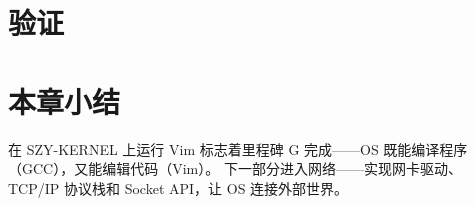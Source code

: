 
\section{验证}
\label{sec:vim-verify}


\section{本章小结}

在 SZY-KERNEL 上运行 Vim 标志着里程碑 G 完成——OS 既能编译程序（GCC），又能编辑代码（Vim）。
下一部分进入网络——实现网卡驱动、TCP/IP 协议栈和 Socket API，让 OS 连接外部世界。
